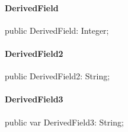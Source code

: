 \documentclass{report}
\begin{document}
\paragraph*{DerivedField}\hspace*{\fill}

\begin{list}{}{
\setlength{\itemindent}{0cm}
\setlength{\listparindent}{0cm}
\setlength{\leftmargin}{\evensidemargin}
\addtolength{\leftmargin}{\tmplength}
\settowidth{\labelsep}{X}
\addtolength{\leftmargin}{\labelsep}
\setlength{\labelwidth}{\tmplength}
}
\begin{flushleft}
\item[\textbf{Declaration}\hfill]
\begin{ttfamily}
public DerivedField: Integer;\end{ttfamily}


\end{flushleft}
\end{list}
\paragraph*{DerivedField2}\hspace*{\fill}

\begin{list}{}{
\setlength{\itemindent}{0cm}
\setlength{\listparindent}{0cm}
\setlength{\leftmargin}{\evensidemargin}
\addtolength{\leftmargin}{\tmplength}
\settowidth{\labelsep}{X}
\addtolength{\leftmargin}{\labelsep}
\setlength{\labelwidth}{\tmplength}
}
\begin{flushleft}
\item[\textbf{Declaration}\hfill]
\begin{ttfamily}
public DerivedField2: String;\end{ttfamily}


\end{flushleft}
\end{list}
\paragraph*{DerivedField3}\hspace*{\fill}

\begin{list}{}{
\setlength{\itemindent}{0cm}
\setlength{\listparindent}{0cm}
\setlength{\leftmargin}{\evensidemargin}
\addtolength{\leftmargin}{\tmplength}
\settowidth{\labelsep}{X}
\addtolength{\leftmargin}{\labelsep}
\setlength{\labelwidth}{\tmplength}
}
\begin{flushleft}
\item[\textbf{Declaration}\hfill]
\begin{ttfamily}
public var DerivedField3: String;\end{ttfamily}


\end{flushleft}
\end{list}
\end{document}
